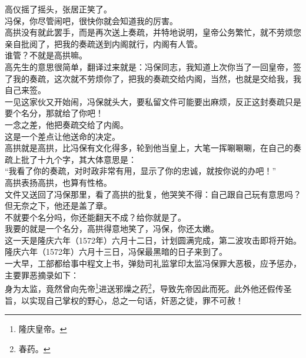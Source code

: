\begin{multicols}{\theparacolNo}
高仪摇了摇头，张居正笑了。\\

冯保，你尽管闹吧，很快你就会知道我的厉害。\\

高拱没有就此罢手，而是再次送上奏疏，并特地说明，皇帝公务繁忙，就不劳烦您亲自批阅了，把我的奏疏送到内阁就行，内阁有人管。\\

谁管？不就是高拱嘛。\\

高先生的意思很简单，翻译过来就是：冯保同志，我知道上次你当了一回皇帝，签了我的奏疏，这次就不劳烦你了，把我的奏疏交给内阁，当然，也就是交给我，我自己来签。\\

一见这家伙又开始闹，冯保就头大，要私留文件可能要出麻烦，反正这封奏疏只是要个名分，那就给了你吧！\\

一念之差，他把奏疏交给了内阁。\\

这是一个差点让他送命的决定。\\

高拱就是高拱，比冯保有文化得多，轮到他当皇上，大笔一挥唰唰唰，在自己的奏疏上批了十九个字，其大体意思是：\\

“我看了你的奏疏，对时政非常有用，显示了你的忠诚，就按你说的办吧！”\\

高拱表扬高拱，也算有性格。\\

文件又送回了冯保那里，看了高拱的批复，他哭笑不得：自己跟自己玩有意思吗？但无奈之下，他还是盖了章。\\

不就要个名分吗，你还能翻天不成？给你就是了。\\

我要的就是一个名分，高拱得意地笑了，冯保，你还太嫩。\\

这一天是隆庆六年（1572年）六月十二日，计划圆满完成，第二波攻击即将开始。\\

隆庆六年（1572年）六月十三日，冯保最黑暗的日子来到了。\\

一大早，工部都给事中程文上书，弹劾司礼监掌印太监冯保罪大恶极，应予惩办，主要罪恶摘录如下：\\

身为太监，竟然曾向先帝\footnote{隆庆皇帝。}进送邪燥之药\footnote{春药。}，导致先帝因此而死。此外他还假传圣旨，以实现自己掌权的野心，总之一句话，奸恶之徒，罪不可赦！\\


\end{multicols}
